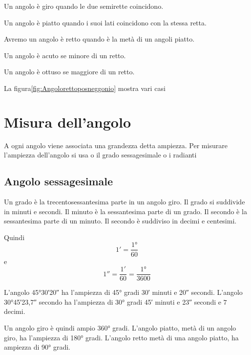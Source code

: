 \begin{definizione}
Un angolo è giro quando le due semirette coincidono. 
\end{definizione}
\begin{definizione}
Un angolo è  piatto quando i suoi lati  coincidono con la stessa retta.
\end{definizione}
\begin{definizione}
Avremo un angolo è retto quando è la metà di un angoli piatto. 
\end{definizione}
\begin{definizione}
Un angolo è acuto se  minore di un  retto.
\end{definizione}
\begin{definizione}
Un angolo è ottuso se  maggiore di un  retto.
\end{definizione}
 La figura\nobs\vref{fig:Angolorettoposneggonio} mostra  vari casi
\section{Misura dell'angolo}
\label{sec:MisuraAngoloGonio}

A ogni angolo viene associata una grandezza detta ampiezza.  Per misurare l'ampiezza dell'angolo si usa o il grado sessagesimale  o i radianti
\subsection{Angolo sessagesimale}
\begin{definizione}[Grado]
Un grado è la trecentosessantesima parte in un angolo giro. Il grado si suddivide in minuti e  secondi. Il minuto è la sessantesima parte di un grado. Il secondo è la sessantesima parte di un minuto. Il secondo è suddiviso in decimi e centesimi.
\end{definizione}
 Quindi \[\ang{;1;}=\dfrac{\ang{1}}{60}\] e  \[\ang{;;1}=\dfrac{\ang{;1;}}{60}=\dfrac{\ang{1}}{3600}\]
\begin{esempio}
L'angolo  \ang{45;30;20}  ha l'ampiezza di \ang{45} gradi \ang{;30;} minuti e \ang{;;20} secondi. L'angolo \ang{30;45;23,7} secondo ha l'ampiezza di \ang{30} gradi \ang{;45;} minuti e \ang{;;23} secondi e $7$ decimi.
\end{esempio}
Un angolo giro è quindi ampio \ang{360} gradi. L'angolo piatto,  metà di un angolo giro, ha l'ampiezza di \ang{180} gradi. L'angolo retto  metà di una angolo piatto, ha ampiezza di \ang{90} gradi.

